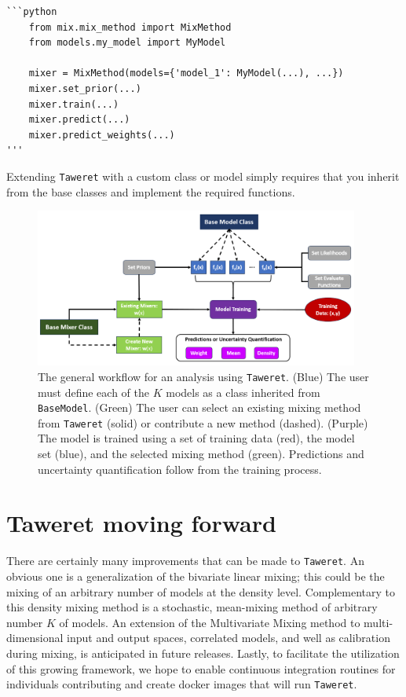 \documentclass[10pt, preprint,aps,prc,floatfix,
tightenlines,
nofootinbib,superscriptaddress]{revtex4-2}
\begin{document}
\begin{verbatim}
```python
    from mix.mix_method import MixMethod
    from models.my_model import MyModel
    
    mixer = MixMethod(models={'model_1': MyModel(...), ...})
    mixer.set_prior(...)
    mixer.train(...)
    mixer.predict(...)
    mixer.predict_weights(...)
'''    
\end{verbatim}
Extending \texttt{Taweret} with a custom class or model simply requires that you inherit from the base classes and implement the required functions. 

\begin{figure}
    \centering
    \includegraphics[width = 0.95\textwidth, height = 0.45\textwidth]{Taweret_JOSS.png}
    \caption{The general workflow for an analysis using \texttt{Taweret}. (Blue) The user must define each of the $K$ models as a class inherited from \texttt{BaseModel}. (Green) The user can select an existing mixing method from \texttt{Taweret} (solid) or contribute a new method (dashed). (Purple) The model is trained using a set of training data (red), the model set (blue), and the selected mixing method (green). Predictions and uncertainty quantification follow from the training process.}
    \label{fig:taweret_workflow}
\end{figure}

\section{Taweret moving forward}

There are certainly many improvements that can be made to \texttt{Taweret}. 
An obvious one is a generalization of the bivariate linear mixing; this could be the mixing of an arbitrary number of models at the density level.
Complementary to this density mixing method is a stochastic, mean-mixing method of arbitrary number $K$ of models.
An extension of the Multivariate Mixing method to multi-dimensional input and output spaces, correlated models, and well as calibration during mixing, is anticipated in future releases.
Lastly, to facilitate the utilization of this growing framework, we hope to enable continuous integration routines for individuals contributing and create docker images that will run \texttt{Taweret}.
\end{document}
